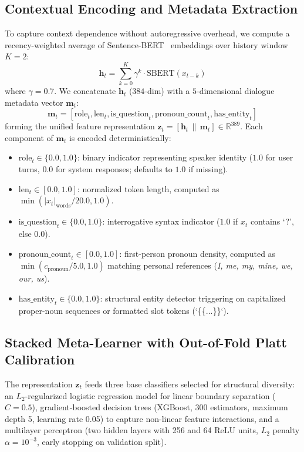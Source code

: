 \documentclass[journal]{IEEEtran}
\begin{document}
\subsection{Contextual Encoding and Metadata Extraction}
To capture context dependence without autoregressive overhead, we compute a recency-weighted average of Sentence-BERT~\cite{reimers2019sentence} embeddings over history window $K=2$:
\begin{equation}
    \mathbf{h}_t = \sum_{k=0}^{K} \gamma^k \cdot \mathrm{SBERT}(x_{t-k})
\end{equation}
where $\gamma = 0.7$. We concatenate $\mathbf{h}_t$ ($384$-dim) with a $5$-dimensional dialogue metadata vector $\mathbf{m}_t$:
\begin{equation}
    \mathbf{m}_t = [\text{role}_t, \text{len}_t, \text{is\_question}_t, \text{pronoun\_count}_t, \text{has\_entity}_t]
\end{equation}
forming the unified feature representation $\mathbf{z}_t = [\mathbf{h}_t \,\|\, \mathbf{m}_t] \in \mathbb{R}^{389}$. Each component of $\mathbf{m}_t$ is encoded deterministically:
\begin{itemize}
    \item $\text{role}_t \in \{0.0, 1.0\}$: binary indicator representing speaker identity ($1.0$ for user turns, $0.0$ for system responses; defaults to $1.0$ if missing).
    \item $\text{len}_t \in [0.0, 1.0]$: normalized token length, computed as $\min(|x_t|_{\text{words}} / 20.0, 1.0)$.
    \item $\text{is\_question}_t \in \{0.0, 1.0\}$: interrogative syntax indicator ($1.0$ if $x_t$ contains `?', else $0.0$).
    \item $\text{pronoun\_count}_t \in [0.0, 1.0]$: first-person pronoun density, computed as $\min(c_{\text{pronoun}} / 5.0, 1.0)$ matching personal references (\textit{I, me, my, mine, we, our, us}).
    \item $\text{has\_entity}_t \in \{0.0, 1.0\}$: structural entity detector triggering on capitalized proper-noun sequences or formatted slot tokens (`\{\{...\}\}`).
\end{itemize}

\subsection{Stacked Meta-Learner with Out-of-Fold Platt Calibration}
The representation $\mathbf{z}_t$ feeds three base classifiers selected for structural diversity: an $L_2$-regularized logistic regression model for linear boundary separation ($C=0.5$), gradient-boosted decision trees (XGBoost, 300 estimators, maximum depth 5, learning rate 0.05) to capture non-linear feature interactions, and a multilayer perceptron (two hidden layers with 256 and 64 ReLU units, $L_2$ penalty $\alpha=10^{-3}$, early stopping on validation split).
\end{document}
